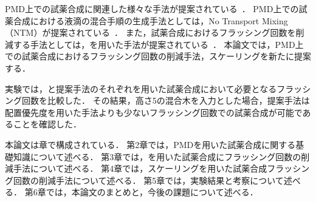     PMD上での試薬合成に関連した様々な手法が提案されている~\cite{bhattacharjee2022algorithms}．
    PMD上での試薬合成における液滴の混合手順の生成手法としては，No Transport Mixing（NTM）が提案されている~\cite{4}．
    また，試薬合成におけるフラッシング回数を削減する手法としては，を用いた手法が提案されている~\cite{10089903}．
    本論文では，PMD上での試薬合成におけるフラッシング回数の削減手法，スケーリングを新たに提案する．

    実験では，と提案手法のそれぞれを用いた試薬合成において必要となるフラッシング回数を比較した．
    その結果，高さ5の混合木を入力とした場合，提案手法は配置優先度を用いた手法よりも少ないフラッシング回数での試薬合成が可能であることを確認した．
    
    本論文は章で構成されている．
    第2章では，PMDを用いた試薬合成に関する基礎知識について述べる．
    第3章では，を用いた試薬合成にフラッシング回数の削減手法について述べる．
    第4章では，スケーリングを用いた試薬合成フラッシング回数の削減手法について述べる．
    第5章では，実験結果と考察について述べる．
    第6章では，本論文のまとめと，今後の課題について述べる．

